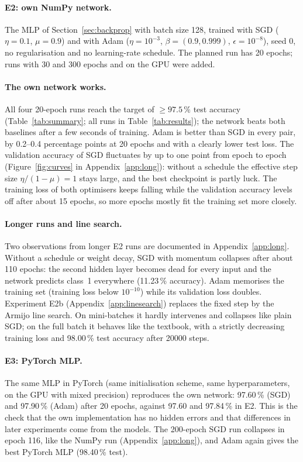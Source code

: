 \documentclass[11pt,a4paper]{article}
\newcommand{\1}{\mathbf{1}}
\begin{document}
\paragraph{E2: own NumPy network.} The MLP of Section~\ref{sec:backprop} with batch size 128,
trained with SGD ($\eta = 0.1$, $\mu = 0.9$) and with Adam ($\eta = 10^{-3}$,
$\beta = (0.9, 0.999)$, $\epsilon = 10^{-8}$), seed 0, no regularisation and no learning-rate
schedule. The planned run has 20 epochs; runs with 30 and 300 epochs and on the GPU were added.

\paragraph{The own network works.} All four 20-epoch runs reach the target of $\ge 97.5\,\%$
test accuracy (Table~\ref{tab:summary}; all runs in Table~\ref{tab:results}); the network beats both baselines after a few
seconds of training. Adam is better than SGD in every pair, by 0.2--0.4 percentage points at 20
epochs and with a clearly lower test loss. The validation accuracy of SGD fluctuates by up to
one point from epoch to epoch (Figure~\ref{fig:curves} in Appendix~\ref{app:long}): without a schedule the effective step
size $\eta/(1-\mu) = 1$ stays large, and the best checkpoint is partly luck. The training loss of
both optimisers keeps falling while the validation accuracy levels off after about 15 epochs, so
more epochs mostly fit the training set more closely.

\paragraph{Longer runs and line search.} Two observations from longer E2 runs are documented in
Appendix~\ref{app:long}. Without a schedule or weight decay, SGD with momentum collapses after
about 110 epochs: the second hidden layer becomes dead for every input and the network predicts
class~1 everywhere (11.23\,\% accuracy). Adam memorises the training set (training loss below
$10^{-10}$) while its validation loss doubles. Experiment E2b (Appendix~\ref{app:linesearch})
replaces the fixed step by the Armijo line search. On mini-batches it hardly intervenes and
collapses like plain SGD; on the full batch it behaves like the textbook, with a strictly
decreasing training loss and 98.00\,\% test accuracy after \num{20000} steps.

\paragraph{E3: PyTorch MLP.} The same MLP in PyTorch (same initialisation scheme, same
hyperparameters, on the GPU with mixed precision) reproduces the own network: 97.60\,\% (SGD) and
97.90\,\% (Adam) after 20 epochs, against 97.60 and 97.84\,\% in E2. This is the check that the
own implementation has no hidden errors and that differences in later experiments come from the
models. The 200-epoch SGD run collapses in epoch 116, like the NumPy run (Appendix~\ref{app:long}), and Adam again
gives the best PyTorch MLP (98.40\,\% test).
\end{document}
